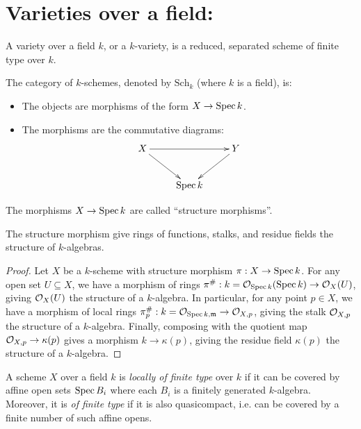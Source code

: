 \documentclass[12pt]{article}
\begin{document}




\section{Varieties over a field:}
\begin{definition}
    A variety over a field $k$, or a $k$-variety, is a reduced, separated scheme of finite type over $k$. 
\end{definition}

\begin{definition}
    The category of $k$-schemes, denoted by $\mathrm{Sch}_k$ (where $k$ is a field), is: 
    \begin{itemize}
        \item The objects are morphisms of the form $X \to \operatorname{Spec} k$.
        \item The morphisms are the commutative diagrams: 
        \[  \xymatrix{ X \ar[rd] \ar[rr] & & Y \ar[ld] \\ & \Spec k &} \]
    \end{itemize}
The morphisms $X \to \operatorname{Spec} k$ are called ``structure morphisms''. 
\end{definition}


\begin{proposition}
    The structure morphism give rings of functions, stalks, and residue fields the structure of $k$-algebras. 
\end{proposition}

\begin{proof}
    Let $X$ be a $k$-scheme with structure morphism $\pi: X \to \operatorname{Spec} k$. For any open set $U \subseteq X$, we have a morphism of rings $\pi^\#: k = \mathcal{O}_{\operatorname{Spec} k}(\operatorname{Spec} k) \to \mathcal{O}_X(U)$, giving $\mathcal{O}_X(U)$ the structure of a $k$-algebra. In particular, for any point $p \in X$, we have a morphism of local rings $\pi_p^\#: k = \mathcal{O}_{\operatorname{Spec} k, \mathfrak{m}} \to \mathcal{O}_{X,p}$, giving the stalk $\mathcal{O}_{X,p}$ the structure of a $k$-algebra. Finally, composing with the quotient map $\mathcal{O}_{X,p} \to \kappa(p)$ gives a morphism $k \to \kappa(p)$, giving the residue field $\kappa(p)$ the structure of a $k$-algebra.    
\end{proof}

\begin{definition}
    A scheme $X$ over a field $k$ is \emph{locally of finite type} over $k$ if it can be covered by affine open sets $\operatorname{Spec} B_i$ where each $B_i$ is a finitely generated $k$-algebra. Moreover, it is \emph{of finite type} if it is also quasicompact, i.e. can be covered by a finite number of such affine opens.
\end{definition}
\end{document}
